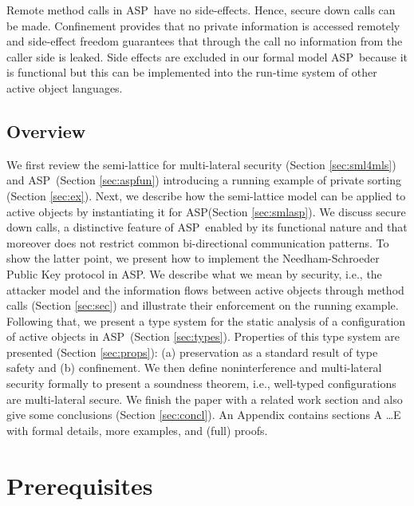 \documentclass[10pt, conference, compsocconf]{IEEEtran}
\newcommand\aspfun{ASP\ }
\newcommand\aspfunp{ASP}
\begin{document}
Remote method calls in \aspfun have no side-effects. Hence, secure down calls can be made.
Confinement provides that no private information is accessed remotely and side-effect freedom
guarantees that through the call no information from the caller side is leaked.
Side effects are excluded in our formal model \aspfun because it is functional 
but this can be implemented into the run-time system of other active object languages.

\subsection*{Overview}
We first review the semi-lattice for multi-lateral security 
(Section \ref{sec:sml4mls}) and \aspfun (Section \ref{sec:aspfun}) introducing
a running example of private sorting (Section \ref{sec:ex}).
Next, we describe how the semi-lattice model can be applied to active
objects by instantiating it for \aspfunp (Section \ref{sec:smlasp}). We 
discuss secure down calls, a distinctive feature of \aspfun enabled by 
its functional nature and that moreover does not restrict common bi-directional
communication patterns. To show the latter point, we present
how to implement the Needham-Schroeder Public Key protocol in \aspfunp.
We describe what we mean by security, i.e., the attacker model and the information 
flows between active objects through method calls (Section \ref{sec:sec}) and illustrate
their enforcement on the running example.
Following that, we present a type system for the static analysis of a configuration of 
active objects in \aspfun (Section \ref{sec:types}). Properties of this type system are 
presented  (Section \ref{sec:props}): 
(a) preservation as a standard result of type safety and (b) confinement.
We then define noninterference and multi-lateral security formally to present a soundness
theorem, i.e., well-typed configurations are multi-lateral secure.
We finish the paper with a related work section and also give some conclusions 
(Section \ref{sec:concl}).
An Appendix contains sections A \dots E with formal details, more examples, and (full) proofs.

\section{Prerequisites}
\label{sec:prereq}
\end{document}
